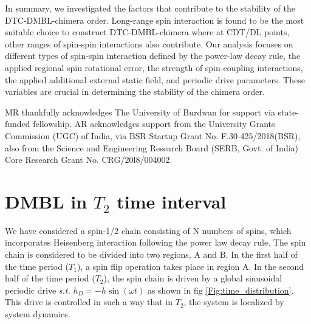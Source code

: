 \documentclass[%
nofootinbib,
reprint,
superscriptaddress,
amsmath,amssymb,showkeys,
aps,
prb,
]{revtex4-2}
\begin{document}
	In summary, we investigated the factors that contribute to the stability of the DTC-DMBL-chimera order. Long-range spin interaction is found to be the most suitable choice to construct DTC-DMBL-chimera where at CDT/DL points, other ranges of spin-spin interactions also contribute. Our analysis focuses on different types of spin-spin interaction defined by the power-law decay rule, the applied regional spin rotational error, the strength of spin-coupling interactions, the applied additional external static field, and periodic drive parameters. These variables are crucial in determining the stability of the chimera order.\\
	
	
	\begin{acknowledgments}
		MR thankfully acknowledges The University of Burdwan for support via state-funded fellowship. AR acknowledges support from the University Grants Commission (UGC) of India, via BSR Startup Grant No. F.30-425/2018(BSR), also from the Science and Engineering Research Board (SERB, Govt. of India) Core Research Grant No. CRG/20l8/004002.
	\end{acknowledgments}
	
	
	\newpage
	\clearpage
	\appendix
	\onecolumngrid
	\section{\label{sec:AppendixA} DMBL in $T_2$ time interval}
	
	We have considered a spin-1/2 chain consisting of N numbers of spins, which  incorporates Heisenberg interaction following the power law decay rule. The spin chain is considered to be divided into two regions, A and B. In the first half of the time period ($T_1$), a spin flip operation takes place in region A. In the second half of the time period ($T_2$), the spin chain is driven by a global sinusoidal periodic drive \textit{s.t.} $h_D = -h\sin(\omega t)$ as shown in fig \ref{Fig:time_distribution}. This drive is controlled in such a way that in $T_2$, the system is localized by system dynamics.
	
\end{document}
